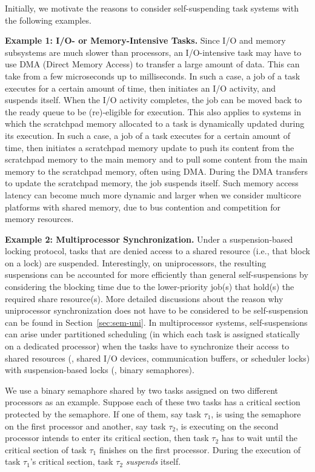 \label{sec:examples}

Initially, we motivate the reasons to consider self-suspending task systems with the following examples.

{\bf Example 1: I/O- or Memory-Intensive Tasks.} Since I/O and memory subsystems are much slower than processors, an I/O-intensive task may have to use DMA (Direct Memory Access) to transfer a large amount of data. This can take from a few microseconds up to milliseconds. In such a case, a job of a task executes for a certain amount of time, then initiates an I/O activity, and suspends itself. When the I/O activity completes, the job can be moved back to the ready queue to be (re)-eligible for execution. This also applies to systems in which the scratchpad memory allocated to a task is dynamically updated during its execution. In such a case, a job of a task executes for a certain amount of time, then initiates a scratchpad memory update to push its content from the scratchpad memory to the main memory and to pull some content from the main memory to the scratchpad memory, often using DMA. During the DMA transfers to update the scratchpad memory, the job suspends itself. Such memory access latency can become much more dynamic and larger when we consider multicore platforms with shared memory, due to bus contention and competition for memory resources.

{\bf Example 2: Multiprocessor Synchronization.} \hspace{0.1in}
Under a suspension-based locking protocol, tasks that are denied access to a shared resource (i.e., that block on a lock) are suspended. Interestingly, on uniprocessors, the resulting suspensions can be accounted for more efficiently than general self-suspensions by considering the blocking time due to the lower-priority job(s) that hold(s) the required share resource(s). More detailed discussions about the reason why uniprocessor synchronization does not have to be considered to be self-suspension can be found in Section~\ref{sec:sem-uni}. In multiprocessor systems, self-suspensions can arise under partitioned scheduling (in which each task is assigned statically on a dedicated processor) when the tasks have to synchronize their access to shared resources (\eg, shared I/O devices, communication buffers, or scheduler locks) with suspension-based locks (\eg, binary semaphores). 

We use a binary semaphore shared by two tasks assigned on two different processors as an example. Suppose each of these two tasks has a critical section protected by the semaphore. If one of them, say task $\tau_1$, is using the semaphore on the first processor and another, say task $\tau_2$, is executing on the second processor intends to enter its critical section, then task $\tau_2$ has to wait until the critical section of task $\tau_1$ finishes on the first processor. During the execution of task $\tau_1$'s critical section, task $\tau_2$ \emph{suspends} itself. 

